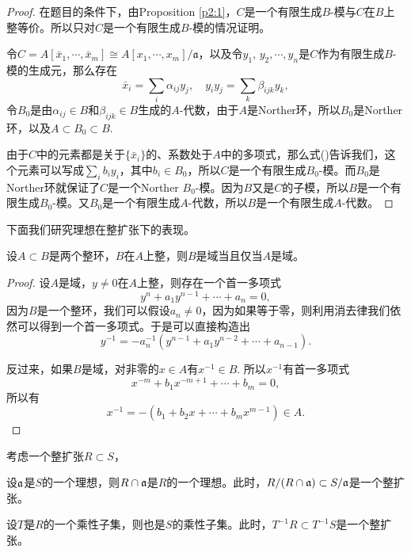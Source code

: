 \begin{proof} 
	在题目的条件下，由Proposition \ref{p2:1}，$C$是一个有限生成$B$-模与$C$在$B$上整等价。所以只对$C$是一个有限生成$B$-模的情况证明。

	令$C=A[\bar{x}_1,\cdots,\bar{x}_m]\cong A[x_1,\cdots,x_m]/\mathfrak{a}$，以及令$y_1$, $y_2,\cdots,y_n$是$C$作为有限生成$B$-模的生成元，那么存在
	\begin{equation}
		\bar{x}_i=\sum_i\alpha_{ij}y_j,\quad y_iy_j=\sum_{k}\beta_{ijk}y_k,
	\end{equation}
	令$B_0$是由$\alpha_{ij}\in B$和$\beta_{ijk}\in B$生成的$A$-代数，由于$A$是Norther环，所以$B_0$是Norther环，以及$A\subset B_0 \subset B$.

	由于$C$中的元素都是关于$\{\bar{x}_i\}$的、系数处于$A$中的多项式，那么式(\theequation)告诉我们，这个元素可以写成$\sum_i b_i y_i$，其中$b_i\in B_0$，所以$C$是一个有限生成$B_0$-模。而$B_0$是Norther环就保证了$C$是一个Norther $B_0$-模。因为$B$又是$C$的子模，所以$B$是一个有限生成$B_0$-模。又$B_0$是一个有限生成$A$-代数，所以$B$是一个有限生成$A$-代数。
\end{proof}

下面我们研究理想在整扩张下的表现。

\begin{pro}
    \label{intfield} 设$A\subset B$是两个整环，$B$在$A$上整，则$B$是域当且仅当$A$是域。
\end{pro}

\begin{proof}
    设$A$是域，$y\neq 0$在$A$上整，则存在一个首一多项式
    \[
        y^n+a_1y^{n-1}+\cdots+a_n=0,
    \]
    因为$B$是一个整环，我们可以假设$a_n\neq 0$，因为如果等于零，则利用消去律我们依然可以得到一个首一多项式。于是可以直接构造出
    \[
        y^{-1}=-a_n^{-1}(y^{n-1}+a_1y^{n-2}+\cdots+a_{n-1}).
    \]

    反过来，如果$B$是域，对非零的$x\in A$有$x^{-1}\in B$. 所以$x^{-1}$有首一多项式
    \[
        x^{-m}+b_1x^{-m+1}+\cdots+b_m=0,
    \]
    所以有
    \[
        x^{-1}=-(b_1+b_2x+\cdots+b_mx^{m-1})\in A.
    \]
\end{proof}

\begin{lem}考虑一个整扩张$R\subset S$，
    \begin{compactenum}[~~~(1)]
        \item 设$\mathfrak{a}$是$S$的一个理想，则$R\cap \mathfrak{a}$是$R$的一个理想。此时，$R/(R\cap \mathfrak{a})\subset S/\mathfrak{a}$是一个整扩张。
        \item 设$T$是$R$的一个乘性子集，则也是$S$的乘性子集。此时，$T^{-1}R\subset T^{-1}S$是一个整扩张。
    \end{compactenum}
\end{lem}


